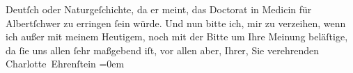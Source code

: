 \begin{ledgroupsized}[t]{13cm}
                    Deutſch oder Naturgeſchichte, da er {\pb}meint, das
                    Doctorat in Medicin für Albertſchwer zu erringen ſein würde. Und nun bitte
                    ich, mir zu verzeihen, wenn ich außer mit meinem Heutigem, noch mit der Bitte um
                    Ihre Meinung beläſtige, da ſie uns allen ſehr maßgebend iſt, vor allen aber,
                    Ihrer, Sie \pend
           \pstart
           verehrenden{\\[\baselineskip]}\spacefill\mbox{Charlotte Ehrenſtein}\pend
           \leftskip=0em{}\endnumbering{}\end{ledgroupsized}  \newcommand{\dateiname}{L01584}\newcommand{\titel}{Charlotte Ehrenstein an Arthur Schnitzler, [Mitte Februar 1906?]}\newcommand{\editorInnen}{Martin Anton Müller und Gerd-Hermann Susen}
      